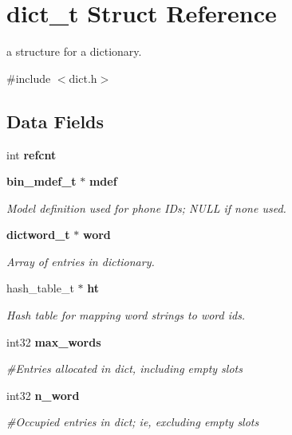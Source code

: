 \section{dict\+\_\+t Struct Reference}
\label{structdict__t}


a structure for a dictionary.  




{\ttfamily \#include $<$dict.\+h$>$}

\subsection*{Data Fields}
\begin{DoxyCompactItemize}
\item 
\mbox{\label{structdict__t_a5fab69be1205a6c84ec93a4b08924d3c}} 
int {\bfseries refcnt}
\item 
\mbox{\label{structdict__t_a3a01eb5a3ebda5652d434be26e0cfdd2}} 
\textbf{ bin\+\_\+mdef\+\_\+t} $\ast$ \textbf{ mdef}
\begin{DoxyCompactList}\small\item\em Model definition used for phone I\+Ds; N\+U\+LL if none used. \end{DoxyCompactList}\item 
\mbox{\label{structdict__t_a9e6636bbe45936a03381fea430addd31}} 
\textbf{ dictword\+\_\+t} $\ast$ \textbf{ word}
\begin{DoxyCompactList}\small\item\em Array of entries in dictionary. \end{DoxyCompactList}\item 
\mbox{\label{structdict__t_a7205aae4fbeef3aaa53f94b6af529af2}} 
hash\+\_\+table\+\_\+t $\ast$ \textbf{ ht}
\begin{DoxyCompactList}\small\item\em Hash table for mapping word strings to word ids. \end{DoxyCompactList}\item 
\mbox{\label{structdict__t_af6142600cef73f846b58ba9bc36b02ac}} 
int32 \textbf{ max\+\_\+words}
\begin{DoxyCompactList}\small\item\em \#\+Entries allocated in dict, including empty slots \end{DoxyCompactList}\item 
\mbox{\label{structdict__t_af00f60319a7025361e291af5addb6b31}} 
int32 \textbf{ n\+\_\+word}
\begin{DoxyCompactList}\small\item\em \#\+Occupied entries in dict; ie, excluding empty slots \end{DoxyCompactList}\item 

\end{DoxyCompactItemize}
